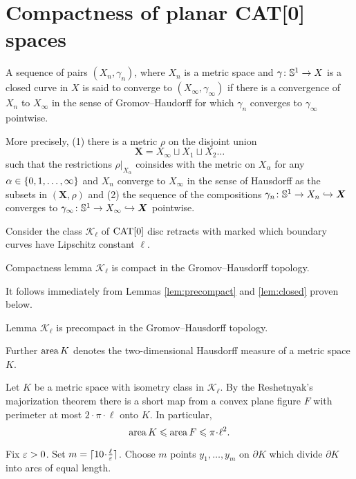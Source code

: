 \section{Compactness of planar CAT[0] spaces}\label{Compactness}

A sequence of pairs $(X_n,\gamma_n)$, where $X_n$ is a metric space and $\gamma\colon\mathbb{S}^1\to X$ is a closed curve in $X$ is said to converge to $(X_\infty,\gamma_\infty)$ if there is a convergence of $X_n$ to $X_\infty$ in the sense of Gromov--Haudorff for which $\gamma_n$ converges to $\gamma_\infty$ pointwise.

More precisely, (1) there is a metric $\rho$ on the disjoint union 
\[\bm{X}=X_\infty\sqcup X_1\sqcup X_2\dots\]
such that the restrictions $\rho|_{X_\alpha}$ coinsides with the metric on $X_\alpha$ for any $\alpha\zz\in\{0,1,\dots,\infty\}$ and $X_n$ converge to $X_\infty$ in the sense of Hausdorff as the subsets in $(\bm{X},\rho)$ and (2) the sequence of the compositions $\gamma_n\colon\mathbb{S}^1\to X_n \hookrightarrow\bm{X}$ converges to $\gamma_\infty\colon\mathbb{S}^1\to X_\infty \hookrightarrow\bm{X}$ pointwise.

Consider the class $\mathcal{K}_\ell$ of $\mathop{\rm CAT}\nolimits[0]$ disc retracts with marked
which boundary curves have Lipschitz constant $\ell$.


\begin{thm}{Compactness lemma}\label{lem:compact}
$\mathcal{K}_\ell$ is compact in the Gromov--Hausdorff topology.
\end{thm}

It follows immediately from Lemmas \ref{lem:precompact} and \ref{lem:closed} proven below.

\begin{thm}{Lemma}\label{lem:precompact}
$\mathcal{K}_\ell$ is precompact in the Gromov--Hausdorff topology.
\end{thm}

Further $\mathop{\rm area}\nolimits K$ denotes the two-dimensional Hausdorff measure of a metric space $K$. 

Let $K$ be a metric space with isometry class in $\mathcal {K}_\ell$.
By the Reshetnyak's majorization theorem there is a short map from a convex plane figure $F$ with perimeter at most $2\cdot\pi\cdot \ell$ onto $K$.
In particular, 
\[\area K \le \area F \le \pi\cdot\ell^2.\]

Fix $\varepsilon>0$. 
Set $m=\lceil 10\cdot\tfrac\ell\eps\rceil$.
Choose $m$ points $y_1,\dots,y_m$ on $\partial K$
which divide $\partial K$ into arcs of equal length.

